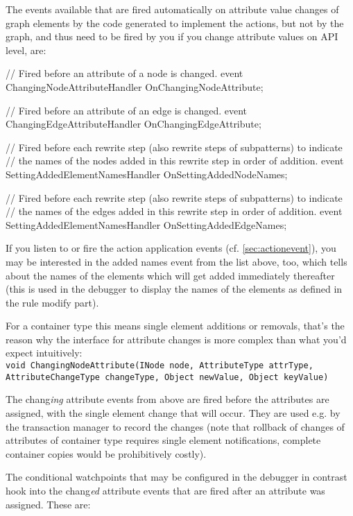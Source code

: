The events available that are fired automatically on attribute value changes of graph elements by the code generated to implement the actions, but not by the graph, and thus need to be fired by you if you change attribute values on API level, are:

\begin{csharplet}
// Fired before an attribute of a node is changed.
event ChangingNodeAttributeHandler OnChangingNodeAttribute;

// Fired before an attribute of an edge is changed.
event ChangingEdgeAttributeHandler OnChangingEdgeAttribute;

// Fired before each rewrite step (also rewrite steps of subpatterns) to indicate 
// the names of the nodes added in this rewrite step in order of addition.
event SettingAddedElementNamesHandler OnSettingAddedNodeNames;

// Fired before each rewrite step (also rewrite steps of subpatterns) to indicate 
// the names of the edges added in this rewrite step in order of addition.
event SettingAddedElementNamesHandler OnSettingAddedEdgeNames;
\end{csharplet}

If you listen to or fire the action application events (cf. \ref{sec:actionevent}), you may be interested in the added names event from the list above, too, which tells about the names of the elements which will get added immediately thereafter (this is used in the debugger to display the names of the elements as defined in the rule modify part).

For a container type this means single element additions or removals, that's the reason why the interface for attribute changes is more complex than what you'd expect intuitively:\\ 
\verb#void ChangingNodeAttribute(INode node, AttributeType attrType,#\\
\verb#AttributeChangeType changeType, Object newValue, Object keyValue)#

The chang\emph{ing} attribute events from above are fired before the attributes are assigned, with the single element change that will occur. 
They are used e.g. by the transaction manager to record the changes (note that rollback of changes of attributes of container type requires single element notifications, complete container copies would be prohibitively costly).

The conditional watchpoints that may be configured in the debugger in contrast hook into the chang\emph{ed} attribute events that are fired after an attribute was assigned. These are:

